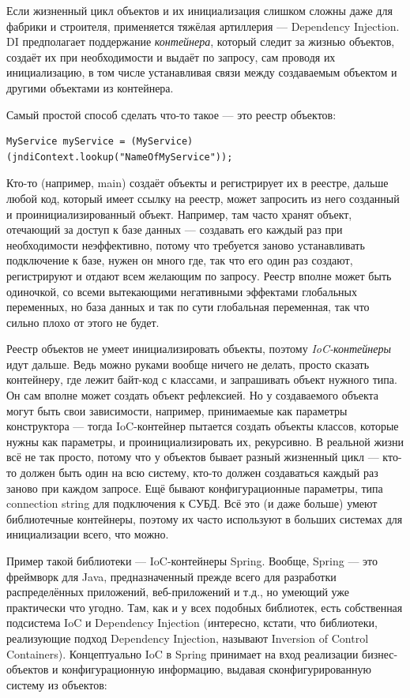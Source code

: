 \documentclass[a5paper]{article}
\begin{document}
Если жизненный цикл объектов и их инициализация слишком сложны даже для фабрики и строителя, применяется тяжёлая артиллерия --- Dependency Injection. DI предполагает поддержание \textit{контейнера}, который следит за жизнью объектов, создаёт их при необходимости и выдаёт по запросу, сам проводя их инициализацию, в том числе устанавливая связи между создаваемым объектом и другими объектами из контейнера.

Самый простой способ сделать что-то такое --- это реестр объектов:

\begin{verbatim}
MyService myService = (MyService)(jndiContext.lookup("NameOfMyService"));
\end{verbatim}

Кто-то (например, main) создаёт объекты и регистрирует их в реестре, дальше любой код, который имеет ссылку на реестр, может запросить из него созданный и проинициализированный объект. Например, там часто хранят объект, отечающий за доступ к базе данных --- создавать его каждый раз при необходимости неэффективно, потому что требуется заново устанавливать подключение к базе, нужен он много где, так что его один раз создают, регистрируют и отдают всем желающим по запросу. Реестр вполне может быть одиночкой, со всеми вытекающими негативными эффектами глобальных переменных, но база данных и так по сути глобальная переменная, так что сильно плохо от этого не будет.

Реестр объектов не умеет инициализировать объекты, поэтому \textit{IoC-контейнеры} идут дальше. Ведь можно руками вообще ничего не делать, просто сказать контейнеру, где лежит байт-код с классами, и запрашивать объект нужного типа. Он сам вполне может создать объект рефлексией. Но у создаваемого объекта могут быть свои зависимости, например, принимаемые как параметры конструктора --- тогда IoC-контейнер пытается создать объекты классов, которые нужны как параметры, и проинициализировать их, рекурсивно. В реальной жизни всё не так просто, потому что у объектов бывает разный жизненный цикл --- кто-то должен быть один на всю систему, кто-то должен создаваться каждый раз заново при каждом запросе. Ещё бывают конфигурационные параметры, типа connection string для подключения к СУБД. Всё это (и даже больше) умеют библиотечные контейнеры, поэтому их часто используют в больших системах для инициализации всего, что можно.

Пример такой библиотеки --- IoC-контейнеры Spring. Вообще, Spring --- это фреймворк для Java, предназначенный прежде всего для разработки распределённых приложений, веб-приложений и т.д., но умеющий уже практически что угодно. Там, как и у всех подобных библиотек, есть собственная подсистема IoC и Dependency Injection (интересно, кстати, что библиотеки, реализующие подход Dependency Injection, называют Inversion of Control Containers). Концептуально IoC в Spring принимает на вход реализации бизнес-объектов и конфигурационную информацию, выдавая сконфигурированную систему из объектов:
\end{document}
